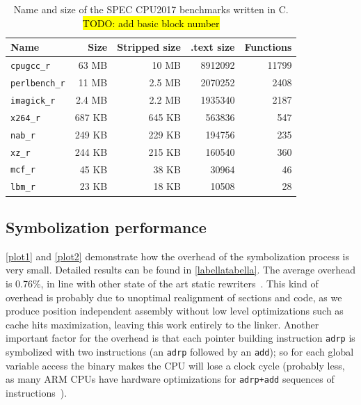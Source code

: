\documentclass[a4paper,11pt,oneside]{report}
\DeclareRobustCommand{\todo}[1]{{\sethlcolor{cyan}\hl{TODO: #1}}}
\begin{document}
\begin{table}
\centering
\begin{tabular}{lrrrr}
\toprule
	\textbf{Name} & \textbf{Size} & \textbf{Stripped size} &  \textbf{.text size} & \textbf{Functions} \\
\toprule
	\texttt{cpugcc\_r   }              & 63 MB  & 10 MB  & 8912092 & 11799 \\
	\texttt{perlbench\_r} \hspace{2em} & 11 MB  & 2.5 MB & 2070252 & 2408  \\
	\texttt{imagick\_r  }              & 2.4 MB & 2.2 MB & 1935340 & 2187  \\
	\texttt{x264\_r }                  & 687 KB & 645 KB & 563836  & 547   \\
	\texttt{nab\_r      }              & 249 KB & 229 KB & 194756  & 235   \\
	\texttt{xz\_r   }                  & 244 KB & 215 KB & 160540  & 360   \\
	\texttt{mcf\_r      }              & 45 KB  & 38 KB  & 30964   & 46    \\
	\texttt{lbm\_r      }              & 23 KB  & 18 KB  & 10508   & 28    \\
\bottomrule
\end{tabular}
	\caption{Name and size of the SPEC CPU2017 benchmarks written in C. \todo{add basic block number}}
\label{tabularasa}
\end{table}

\subsection{Symbolization performance}

\autoref{plot1} and \autoref{plot2} demonstrate how the overhead of the
symbolization process is very small. Detailed results can be found in
\autoref{labellatabella}.  The average overhead is 0.76\%, in line with other
state of the art static rewriters~\cite{egalito}.  This kind of overhead is
probably due to unoptimal realignment of sections and code, as we produce
position independent assembly without low level optimizations such as cache
hits maximization, leaving this work entirely to the linker. Another important
factor for the overhead is that each pointer building instruction \texttt{adrp}
is symbolized with two instructions (an \texttt{adrp} followed by an
\texttt{add}); so for each global variable access the binary makes the CPU will
lose a clock cycle (probably less, as many ARM CPUs have hardware optimizations
for \texttt{adrp+add} sequences of instructions~\cite{pointeroptimizations}).
\end{document}
